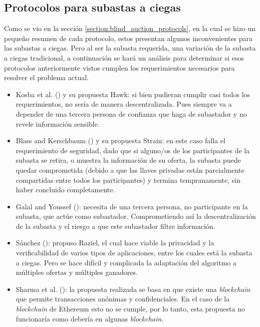   \subsection{Protocolos para subastas a ciegas}
    Como se vio en la sección \ref{section:blind_auction_protocols}, en la cual se hizo un pequeño resumen
    de cada protocolo, estos presentan algunos inconvenientes para las subastas a ciegas.
    Pero al ser la subasta requerida, una variación de la subasta a ciegas tradicional, a continuación
    se hará un análisis para determinar si esos protocolos anteriormente vistos cumplen los requerimientos necesarios
    para resolver el problema actual.

    \begin{itemize}
      \item Kosba et al. (\citeyear{kosba2016hawk}) y su propuesta Hawk: si bien pudieran cumplir casi
      todos los requerimientos, no sería de manera descentralizada. Pues siempre va a depender de una
      tercera persona de confianza que haga de subastador y no revele información sensible.

      \item Blass and Kerschbaum (\citeyear{blass2017strain}) y su propuesta Strain: en este caso falla
      el requerimiento de seguridad, dado que si alguno/os de los participantes de la subasta se retira,
      o muestra la información de su oferta, la subasta puede quedar comprometida (debido a que las 
      llaves privadas están parcialmente compartidas entre todos los participantes) y termina 
      tempranamente, sin haber concluido completamente.

      \item Galal and Youssef (\citeyear{galalyusef2018a}): necesita de una tercera persona, no participante
      en la subasta, que actúe como subastador. Comprometiendo así la descentralización de la subasta y el
      riesgo a que este subastador filtre información.
      
      \item Sánchez (\citeyear{sanchez2020}): propuso Raziel, el cual hace viable la privacidad y la
      verificabilidad de varios tipos de aplicaciones, entre los cuales está la subasta a ciegas. Pero
      se hace difícil y complicada la adaptación del algoritmo a múltiples ofertas y múltiples ganadores.

      \item Sharma et al. (\citeyear{sharma2021}): la propuesta realizada se basa en que existe 
      una \textit{blockchain} que permite transacciones anónimas y confidenciales. En el caso de la 
      \textit{blockchain} de Ethereum esto no se cumple, por lo tanto, esta propuesta no funcionaría como debería
      en algunas \textit{blockchain}.


\end{itemize}
